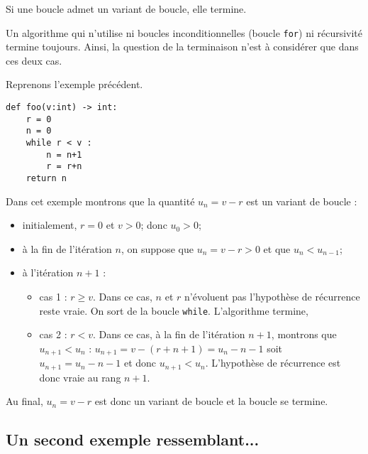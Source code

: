 \begin{theorem}
Si une boucle admet un variant de boucle, elle termine.
\end{theorem}

\begin{prop}
Un algorithme qui n’utilise ni boucles inconditionnelles (boucle \texttt{for}) ni récursivité termine toujours. Ainsi,
la question de la terminaison n’est à considérer que dans ces deux cas.
\end{prop}

Reprenons l'exemple précédent. 
\begin{lstlisting}
def foo(v:int) -> int:
    r = 0
    n = 0
    while r < v : 
        n = n+1
        r = r+n
    return n
\end{lstlisting}

Dans cet exemple montrons que la quantité $u_n = v-r$ est un variant de boucle : 
\begin{itemize}
\item initialement, $r=0$ et $v>0$; donc  $u_0 > 0$;
\item à la fin de l'itération $n$, on suppose que $u_n = v-r >0$ et que $u_n < u_{n-1}$;
\item à l'itération $n+1$ : 
\begin{itemize}
\item cas 1 : $r\geq v$. Dans ce cas, $n$ et $r$ n'évoluent pas l'hypothèse de récurrence reste vraie. On sort de la boucle \texttt{while}. L'algorithme termine,
\item cas 2 : $r < v$. Dans ce cas, à la fin de l'itération $n+1$,  montrons que  $u_{n+1} < u_{n}$ : $u_{n+1} = v - (r + n + 1) =  u_n -n - 1$ soit $u_{n+1} =u_n -n - 1$ et donc $u_{n+1} < u_{n}$. L'hypothèse de récurrence est donc vraie au rang $n+1$. 
\end{itemize}
\end{itemize}

Au final, $u_n = v-r$ est donc un variant de boucle et la boucle se termine.


\subsection{Un second exemple ressemblant...} 




